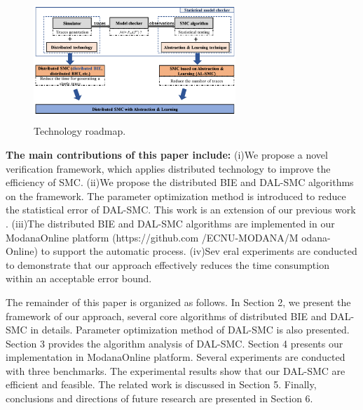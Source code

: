 \begin{figure}[htbp]
	{
	\centering	
	\includegraphics[width=3.0in,height=1.8in]{fig/paper-framework.png}
\caption{Technology roadmap.}\label{tech-map}	
	}
	
\end{figure}

\textbf{The main contributions of this paper include:} (i)We propose a novel verification framework, which applies distributed technology to improve the efficiency of SMC. (ii)We propose the distributed BIE and DAL-SMC algorithms on the framework. The parameter optimization method is introduced to reduce the statistical error of DAL-SMC. This work is an extension of our previous work \cite{jiangkaiqiang2016}. (iii)The distributed BIE and DAL-SMC algorithms are implemented in our ModanaOnline platform  \cite{Cheng2015Modana} (https://github.com
/ECNU-MODANA/M
odana-Online) to support the automatic process. (iv)Sev
eral experiments are conducted to demonstrate that our approach effectively reduces the time consumption within an acceptable error bound.

The remainder of this paper is organized as follows. In Section 2, we present the framework of our approach, several core algorithms of distributed BIE and DAL-SMC in details. Parameter optimization method of DAL-SMC is also presented. Section 3 provides the algorithm analysis of DAL-SMC. Section 4 presents our implementation in ModanaOnline platform. Several experiments are conducted with three benchmarks. The experimental results show that our DAL-SMC are efficient and feasible. The related work is discussed in Section 5. Finally, conclusions and directions of future research are presented in Section 6. 